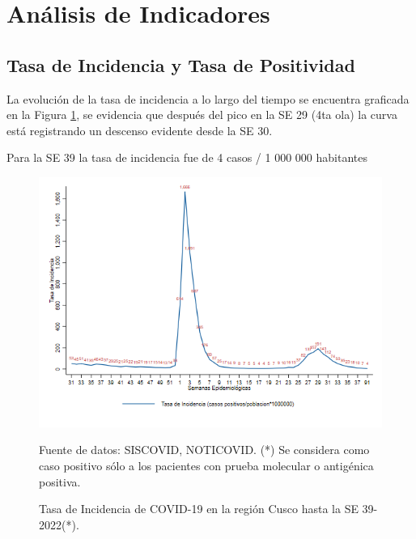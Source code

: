 \documentclass[12pt,a4paper,openany]{book}
\begin{document}
	
	
	\clearpage
	
	\section*{Análisis de Indicadores}
	\subsection*{Tasa de Incidencia y Tasa de Positividad}
	\noindent La evolución de la tasa de incidencia a lo largo del tiempo se encuentra graficada en la Figura \ref{fig:incidencia}, se
	evidencia que después del pico en la SE 29 (4ta ola) la curva está registrando un descenso evidente desde la SE 30.
	
	Para la SE 39 la tasa de incidencia fue de 4 casos / 1 000 000 habitantes
	
	
	\begin{figure}[h]
		\caption{Tasa de Incidencia de COVID-19 en la región Cusco hasta la SE 39-2022(*).  }\label{fig:incidencia}
		\begin{center}
			\includegraphics[width=0.90\linewidth]{../figuras/tasa_incidencia_2021_2022.png}
		\end{center}
		{\footnotesize {Fuente de datos: SISCOVID, NOTICOVID. (*) Se considera como caso positivo sólo a los pacientes con prueba molecular o antigénica positiva.}}
	\end{figure}
	
\end{document}
